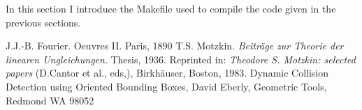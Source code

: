 \documentclass[12pt, a4paper]{article}
\begin{document}
In this section I introduce the Makefile used to compile the code given in the previous sections.\\

\begin{scriptsize}
\begin{ttfamily}

\end{ttfamily}
\end{scriptsize}

\begin{thebibliography}{9}
 J.J.-B. Fourier. Oeuvres II. Paris, 1890
 T.S. Motzkin. {\em Beitr\"{a}ge zur Theorie der linearen Ungleichungen}. Thesis, 1936. Reprinted in: {\em Theodore S. Motzkin: selected papers} (D.Cantor et al., eds,), Birkh\"{a}user, Boston, 1983.
 Dynamic Collision Detection using Oriented Bounding
Boxes, David Eberly, Geometric Tools, Redmond WA 98052
\end{thebibliography}
\end{document}
